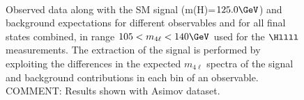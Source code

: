 \begin{figure}[!h!t]
\begin{center}
{      \label{fig:differential-bins-asimov:d}                                                                                                                            
    } \\
    \caption{Observed data along with the SM signal (m(H)=$125.0 \GeV$) and background expectations for different observables and for all final states combined, in range $105 < m_{4\ell} < 140 \GeV$ used for the $\Hllll$ measurements. The extraction of the signal is performed by exploiting the differences in the expected $m_{4\ell}$ spectra of the signal and background contributions in each bin of an observable.
    COMMENT: Results shown with Asimov dataset.
    }
  \label{fig:differential-bins-asimov}
 \end{center}
\end{figure}



